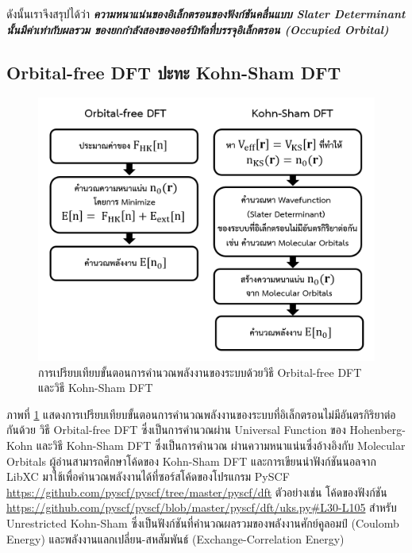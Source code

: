 ดังนั้นเราจึงสรุปได้ว่า  \textbf{\textit{ความหนาแน่นของอิเล็กตรอนของฟังก์ชันคลื่นแบบ Slater Determinant นั้นมีค่าเท่ากับผลรวม%
ของยกกำลังสองของออร์บิทัลที่บรรจุอิเล็กตรอน (Occupied Orbital)}}

\subsection{Orbital-free DFT ปะทะ Kohn-Sham DFT}
\label{ssec:orb_free_vs_kohn_sham_dft}

\begin{figure}[htbp]
    \centering
    \includegraphics[width=\linewidth]{fig/orb_free_vs_kohn_sham.png}
    \caption{การเปรียบเทียบขั้นตอนการคำนวณพลังงานของระบบด้วยวิธี Orbital-free DFT และวิธี Kohn-Sham DFT}
    \label{fig:orb_free_vs_kohn_sham}
\end{figure}

ภาพที่ \ref{fig:orb_free_vs_kohn_sham} แสดงการเปรียบเทียบขั้นตอนการคำนวณพลังงานของระบบที่อิเล็กตรอนไม่มีอันตรกิริยาต่อกันด้วย%
วิธี Orbital-free DFT ซึ่งเป็นการคำนวณผ่าน Universal Function ของ Hohenberg-Kohn และวิธี Kohn-Sham DFT ซึ่งเป็นการคำนวณ%
ผ่านความหนาแน่นซึ่งอ้างอิงกับ Molecular Orbitals ผู้อ่านสามารถศึกษาโค้ดของ Kohn-Sham DFT และการเขียนนำฟังก์ชันนอลจาก LibXC 
มาใช้เพื่อคำนวณพลังงานได้ที่ซอร์สโค้ดของโปรแกรม PySCF \url{https://github.com/pyscf/pyscf/tree/master/pyscf/dft} 
ตัวอย่างเช่น โค้ดของฟังก์ชัน  
\url{https://github.com/pyscf/pyscf/blob/master/pyscf/dft/uks.py#L30-L105} สำหรับ Unrestricted Kohn-Sham 
ซึ่งเป็นฟังก์ชันที่คำนวณผลรวมของพลังงานศักย์คูลอมป์ (Coulomb Energy) และพลังงานแลกเปลี่ยน-สหสัมพันธ์ (Exchange-Correlation 
Energy)

